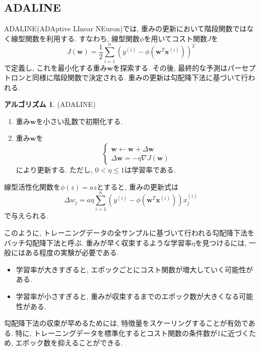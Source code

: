 \documentclass[uplatex]{jsarticle}
\theoremstyle{definition}
\newtheorem{algorithm}[definition]{アルゴリズム}
\numberwithin{equation}{section}
\begin{document}
\subsection{ADALINE}
ADALINE(ADAptive LInear NEuron)では, 重みの更新において階段関数ではなく線型関数を利用する.
すなわち, 線型関数$\phi$を用いてコスト関数$J$を
\begin{equation}
    J(\bm{w}) = \frac{1}{2}\sum_{i = 1}^{n}(y^{(i)} - \phi(\bm{w}^{T}\bm{x}^{(i)}))^{2}
\end{equation}
で定義し, これを最小化する重み$\bm{w}$を探索する.
その後, 最終的な予測はパーセプトロンと同様に階段関数で決定される.
重みの更新は勾配降下法に基づいて行われる.
\begin{algorithm}
    (ADALINE)
    \begin{enumerate}
        \item
        重み$\bm{w}$を小さい乱数で初期化する.
        \item
        重み$\bm{w}$を
        \begin{equation}
            \begin{cases}
                \bm{w} \leftarrow \bm{w} + \Delta\bm{w} \\
                \Delta\bm{w} = -\eta\nabla J(\bm{w})
            \end{cases}
        \end{equation}
        により更新する.
        ただし, $0 < \eta \leq 1$は学習率である.
    \end{enumerate}
\end{algorithm}
線型活性化関数を$\phi(z) = az$とすると, 重みの更新式は
\begin{equation}
    \Delta w_{j} = a\eta\sum_{i = 1}^{n} (y^{(i)} - \phi(\bm{w}^{T}\bm{x}^{(i)}))x^{(i)}_{j}
\end{equation}
で与えられる. 

このように, トレーニングデータの全サンプルに基づいて行われる勾配降下法をバッチ勾配降下法と呼ぶ.
重みが早く収束するような学習率$\eta$を見つけるには, 一般にはある程度の実験が必要である.
\begin{itemize}
    \item
    学習率が大きすぎると, エポックごとにコスト関数が増大していく可能性がある.
    \item
    学習率が小さすぎると, 重みが収束するまでのエポック数が大きくなる可能性がある.
\end{itemize}

勾配降下法の収束が早めるためには, 特徴量をスケーリングすることが有効である.
特に, トレーニングデータを標準化するとコスト関数の条件数が1に近づくため, エポック数を抑えることができる.
\end{document}

